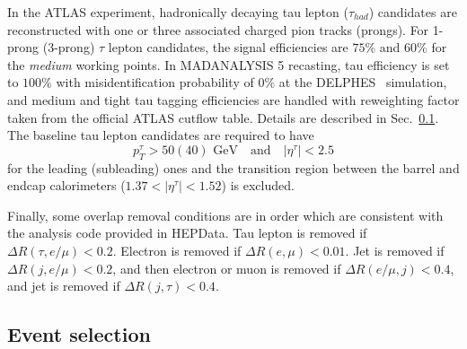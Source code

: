 \documentclass{ws-mpla}
\begin{document}
In the ATLAS experiment, hadronically decaying tau lepton ($\tau_{had}$) candidates are reconstructed with one or three associated charged pion tracks (prongs). %
For 1-prong (3-prong) $\tau$ lepton candidates, the signal efficiencies are $75\%$ and $60\%$ for the \textit{medium} working points. %
In MADANALYSIS 5 recasting, tau efficiency is set to $100\%$ with misidentification probability of $0\%$ at the DELPHES~\cite{deFavereau:2013fsa} simulation, and medium and tight tau tagging efficiencies are handled with reweighting factor taken from the official ATLAS cutflow table. Details are described in Sec.~\ref{sec:selection}.
The baseline tau lepton candidates are required to have 
\begin{equation}
p^{\tau}_T > 50 (40) \textrm{ GeV}\quad \textrm{and}\quad |\eta^{\tau}| < 2.5
\end{equation}
for the leading (subleading) ones and the transition region between the barrel and endcap calorimeters ($ 1.37 < |\eta^{\tau}| < 1.52 $) is excluded.

Finally, some overlap removal conditions are in order which are consistent with the analysis code provided in HEPData\cite{hepdata}.
Tau lepton is removed if $\Delta R(\tau,e/\mu) < 0.2$. Electron is removed if $\Delta R(e,\mu) < 0.01$. Jet is removed if $\Delta R(j,e/\mu) < 0.2$, and then electron or muon is removed if $\Delta R(e/\mu,j) < 0.4$, and jet is removed if $\Delta R(j,\tau) < 0.4$.


\subsection{Event selection}\label{sec:selection}
\end{document}
